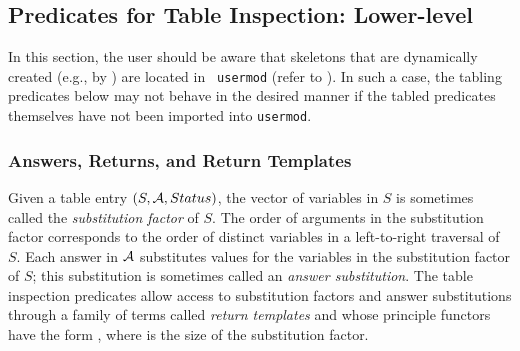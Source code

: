 \begin{description}


\subsection{Predicates for Table Inspection: Lower-level} \label{sec:table-inspection-low}
\label{sec:TablePred:Inspection}

In this section, the user should be aware that skeletons that are
dynamically created (e.g., by ) are located in {\tt
  usermod} (refer to ).  In such a case, the tabling
predicates below may not behave in the desired manner if the tabled
predicates themselves have not been imported into {\tt usermod}.

\subsubsection*{Answers, Returns, and Return Templates}
%
%
Given a table entry $(S,{\cal A},Status)$, the vector of variables in $S$ is
sometimes called the {\em substitution factor} of $S$.  The order of
arguments in the substitution factor corresponds to the order of
distinct variables in a left-to-right traversal of $S$.  Each answer
in ${\cal A}$ substitutes values for the variables in the substitution
factor of $S$; this substitution is sometimes called an {\em answer
  substitution}.  The table inspection predicates allow access to
substitution factors and answer substitutions through a family of
terms called {\em return templates} and whose principle functors have
the form \retn, where  is the size of the substitution factor.


\end{description}
